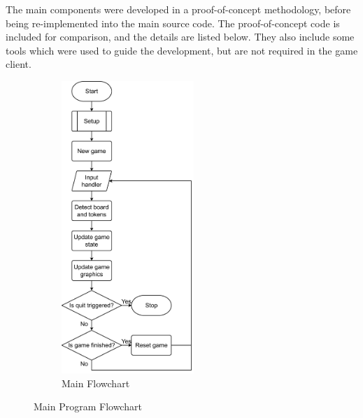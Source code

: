 \documentclass[12pt]{article}
\begin{document}
The main components were developed in a proof-of-concept methodology, before being re-implemented into the main source code. 
The proof-of-concept code is included for comparison, and the details are listed below.
They also include some tools which were used to guide the development, but are not required in the game client. 

\begin{figure}[H]
    \centering
    \begin{subfigure}{1\textwidth}
        \includegraphics[width=0.55\textwidth]{images/figures/fig6a}
        \caption{Main Flowchart}
        \label{fig:maina}
    \end{subfigure}
    \caption{Main Program Flowchart}
    \label{fig:main}
\end{figure}
\end{document}
